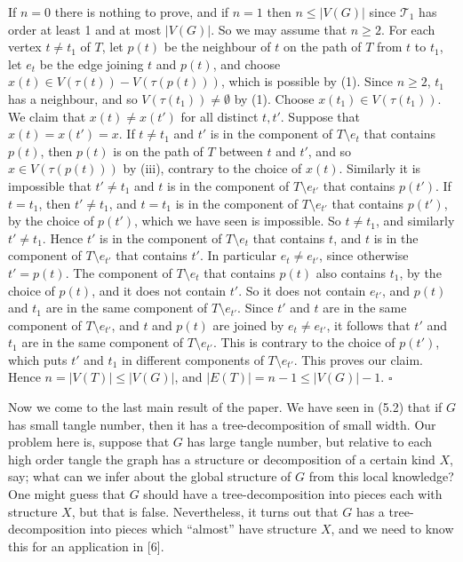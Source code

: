 {If $n = 0$ there is nothing to prove, and if $n = 1$ then $n \le |V(G)|$ since $\mathscr{T}_1$ has order at least 1 and at most $|V(G)|$. So we may assume that $n \ge 2$. For each vertex $t \ne t_1$ of $T$, let $p(t)$ be the neighbour of $t$ on the path of $T$ from $t$ to $t_1$, let $e_t$ be the edge joining $t$ and $p(t)$, and choose $x(t) \in V(\tau(t)) - V(\tau(p(t)))$, which is possible by (1). Since $n \ge 2$, $t_1$ has a neighbour, and so $V(\tau(t_1)) \ne \emptyset$ by (1). Choose $x(t_1) \in V(\tau(t_1))$. We claim that $x(t) \ne x(t')$ for all distinct $t, t'$. Suppose that $x(t) = x(t') = x$. If $t \ne t_1$ and $t'$ is in the component of $T \setminus e_t$ that contains $p(t)$, then $p(t)$ is on the path of $T$ between $t$ and $t'$, and so $x \in V(\tau(p(t)))$ by (iii), contrary to the choice of $x(t)$. Similarly it is impossible that $t' \ne t_1$ and $t$ is in the component of $T \setminus e_{t'}$ that contains $p(t')$. If $t = t_1$, then $t' \ne t_1$, and $t = t_1$ is in the component of $T \setminus e_{t'}$ that contains $p(t')$, by the choice of $p(t')$, which we have seen is impossible. So $t \ne t_1$, and similarly $t' \ne t_1$. Hence $t'$ is in the component of $T \setminus e_t$ that contains $t$, and $t$ is in the component of $T \setminus e_{t'}$ that contains $t'$. In particular $e_t \ne e_{t'}$, since otherwise $t' = p(t)$. The component of $T \setminus e_t$ that contains $p(t)$ also contains $t_1$, by the choice of $p(t)$, and it does not contain $t'$. So it does not contain $e_{t'}$, and $p(t)$ and $t_1$ are in the same component of $T \setminus e_{t'}$. Since $t'$ and $t$ are in the same component of $T \setminus e_{t'}$, and $t$ and $p(t)$ are joined by $e_t \ne e_{t'}$, it follows that $t'$ and $t_1$ are in the same component of $T \setminus e_{t'}$. This is contrary to the choice of $p(t')$, which puts $t'$ and $t_1$ in different components of $T \setminus e_{t'}$. This proves our claim. Hence $n = |V(T)| \le |V(G)|$, and $|E(T)| = n - 1 \le |V(G)| - 1$.} $\square$


Now we come to the last main result of the paper. We have seen in (5.2) that if $G$ has small tangle number, then it has a tree-decomposition of small width. Our problem here is, suppose that $G$ has large tangle number, but relative to each high order tangle the graph has a structure or decomposition of a certain kind $X$, say; what can we infer about the global structure of $G$ from this local knowledge? One might guess that $G$ should have a tree-decomposition into pieces each with structure $X$, but that is false. Nevertheless, it turns out that $G$ has a tree-decomposition into pieces which ``almost'' have structure $X$, and we need to know this for an application in [6].
